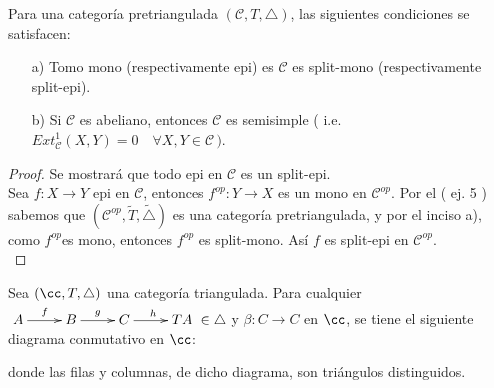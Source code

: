 \documentclass{article}
\begin{document}
	\begin{propsn}
		Para una categoría pretriangulada $(\mathscr{C},T,\triangle)$, las siguientes condiciones se satisfacen:
	\begin{itemize}
		\item[a)] Tomo mono (respectivamente epi) es $\mathscr{C}$ es split-mono (respectivamente split-epi).
		\item[b)] Si $\mathscr{C}$ es abeliano, entonces $\mathscr{C}$ es semisimple ( i.e. \\ $Ext^{1}_\mathscr{C}(X,Y)=0\quad \forall X,Y\in \mathscr{C}\,)$.
	\end{itemize}
	\end{propsn}
	\begin{proof}
		Se mostrará que todo epi en $\mathscr{C}$ es un split-epi.\\
		
		Sea $f:X\to Y$ epi en $\mathscr{C}$, entonces $f^{op}:Y\to X$ es un mono en $\mathscr{C}^{op}$. Por el ( ej. 5 ) sabemos que 
		$(\mathscr{C}^{op},\tilde{T},\tilde{\triangle})$ es una categoría pretriangulada, y por el inciso a), como $f^{op}$es mono, entonces $f^{op}$ es 
		split-mono. Así $f$ es split-epi en $\mathscr{C}^{op}$.\\
	\end{proof}
	
	\begin{propsn}
		Sea $(\cc,T,\triangle)$ una categor\'ia triangulada. Para cualquier $\xymatrix{A\ar[r]^f & B\ar[r]^g & C\ar[r]^h & TA }\in \triangle$ y $\beta:C\to C$ en $\cc$, se tiene el siguiente diagrama conmutativo en $\cc$:
	
	\begin{center}
	\end{center}
	donde las filas y columnas, de dicho diagrama, son triángulos distinguidos.
	\end{propsn}
	
\end{document}
